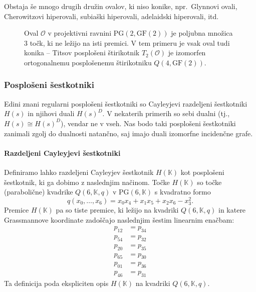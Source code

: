 \documentclass[fin1, tisk]{fmfdelo}
\newcommand{\OO}{\mathcal{O}}
\newcommand{\PG}{\mathrm{PG}}
\newcommand{\GF}{\mathrm{GF}}
\begin{document}
\begin{opomba}
    Obstaja še mnogo drugih družin ovalov, ki niso konike, npr.~Glynnovi ovali, Cherowitzovi hiperovali, subiaški hiperovali, adelaidski hiperovali, itd.
\end{opomba}

\begin{figure}[htbp]
    \centering
    \caption{Oval $\OO$ v projektivni ravnini $\PG(2, \GF(2))$ je poljubna množica $3$ točk, ki ne ležijo na isti premici.
    V tem primeru je vsak oval tudi konika -- Titsov posplošeni štirikotnik $T_2(\OO)$ je izomorfen ortogonalnemu posplošenemu štirikotniku $Q(4, \GF(2))$.}
\end{figure}






\subsubsection{Posplošeni šestkotniki}
Edini znani regularni posplošeni šestkotniki so Cayleyjevi razdeljeni šestkotniki
$H(s)$ in njihovi duali $H(s)^D$. V nekaterih primerih so sebi dualni (tj., $H(s) \cong H(s)^D$), vendar ne v vseh.
Nas bodo taki posplošeni šestkotniki zanimali zgolj do dualnosti natančno, 
saj imajo duali izomorfne incidenčne grafe.

\paragraph{Razdeljeni Cayleyjevi šestkotniki}

\begin{definicija}\label{def:generalized_hexagon}
    Definiramo lahko razdeljeni Cayleyjev šestkotnik $H(\mathbb{K})$ kot posplošeni šestkotnik, 
    ki ga dobimo z naslednjim načinom.
    Točke $H(\mathbb{K})$ so točke (parabolične) kvadrike $Q(6, \mathbb{K}, q)$ v $\PG(6, \mathbb{K})$ s
    kvadratno formo
    \[q(x_0, \ldots, x_6) = x_0x_4 + x_1x_5 + x_2x_6 - x_3^2 .\]
    Premice $H(\mathbb{K})$ pa so tiste premice, ki ležijo na kvadriki $Q(6, \mathbb{K}, q)$
    in katere Grass\-man\-no\-ve koordinate zadoščajo naslednjim šestim linearnim enačbam:
    \begin{align*}
        p_{12} &= p_{34}\\
        p_{54} &= p_{32}\\
        p_{20} &= p_{35}\\
        p_{65} &= p_{30}\\
        p_{01} &= p_{36}\\
        p_{46} &= p_{31}
    \end{align*}
    Ta definicija poda ekspliciten opis $H(\mathbb{K})$ na kvadriki $Q(6, \mathbb{K}, q)$.
\end{definicija}
\end{document}
